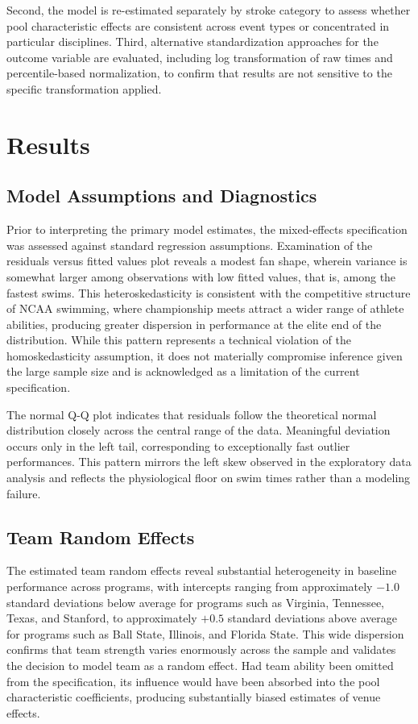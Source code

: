 \documentclass[12pt]{article}
\begin{document}
Second, the model is re-estimated separately by stroke category to assess
whether pool characteristic effects are consistent across event types or
concentrated in particular disciplines. Third, alternative standardization
approaches for the outcome variable are evaluated, including log transformation
of raw times and percentile-based normalization, to confirm that results are not
sensitive to the specific transformation applied.

\section{Results}
\label{sec:results}

\subsection{Model Assumptions and Diagnostics}

Prior to interpreting the primary model estimates, the mixed-effects
specification was assessed against standard regression assumptions. Examination
of the residuals versus fitted values plot reveals a modest fan shape, wherein
variance is somewhat larger among observations with low fitted values, that is,
among the fastest swims. This heteroskedasticity is consistent with the
competitive structure of NCAA swimming, where championship meets attract a wider
range of athlete abilities, producing greater dispersion in performance at the
elite end of the distribution. While this pattern represents a technical
violation of the homoskedasticity assumption, it does not materially compromise
inference given the large sample size and is acknowledged as a limitation of
the current specification.

The normal Q-Q plot indicates that residuals follow the theoretical normal
distribution closely across the central range of the data. Meaningful deviation
occurs only in the left tail, corresponding to exceptionally fast outlier
performances. This pattern mirrors the left skew observed in the exploratory
data analysis and reflects the physiological floor on swim times rather than a
modeling failure.

\subsection{Team Random Effects}

The estimated team random effects reveal substantial heterogeneity in baseline
performance across programs, with intercepts ranging from approximately $-1.0$
standard deviations below average for programs such as Virginia, Tennessee,
Texas, and Stanford, to approximately $+0.5$ standard deviations above average
for programs such as Ball State, Illinois, and Florida State. This wide
dispersion confirms that team strength varies enormously across the sample and
validates the decision to model team as a random effect. Had team ability been
omitted from the specification, its influence would have been absorbed into the
pool characteristic coefficients, producing substantially biased estimates of
venue effects.
\end{document}
